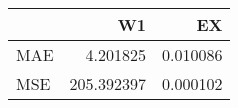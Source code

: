 \begin{tabular}{lrr}
\toprule
{} &          W1 &        EX \\
\midrule
MAE &    4.201825 &  0.010086 \\
MSE &  205.392397 &  0.000102 \\
\bottomrule
\end{tabular}
